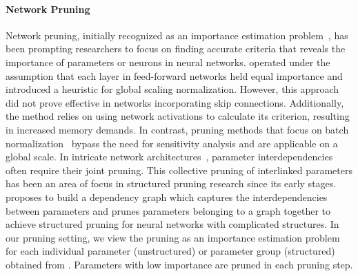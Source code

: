 \paragraph{Network Pruning}
Network pruning, initially recognized as an importance estimation problem~\citep{molchanov2019importance, chauvin1988back, yu2018nisp,he2020learning}, has been prompting researchers to focus on finding accurate criteria that reveals the importance of parameters or neurons in neural networks. \citet{molchanov2016pruning} operated under the assumption that each layer in feed-forward networks held equal importance and introduced a heuristic for global scaling normalization. However, this approach did not prove effective in networks incorporating skip connections. Additionally, the method relies on using network activations to calculate its criterion, resulting in increased memory demands. In contrast, pruning methods that focus on batch normalization~\citep{gordon2018morphnet,huang2018data,liu2017learning,ye2018rethinking} bypass the need for sensitivity analysis and are applicable on a global scale. In intricate network architectures~\citep{liu2021group,luo2020neural,you2019gate,zhang2021aligned}, parameter interdependencies often require their joint pruning. This collective pruning of interlinked parameters has been an area of focus in structured pruning research since its early stages. \citet{fang2023depgraph} proposes to build a dependency graph which captures the interdependencies between parameters and prunes parameters belonging to a graph together to achieve structured pruning for neural networks with complicated structures. In our pruning setting, we view the pruning as an importance estimation problem for each individual parameter (unstructured) or parameter group (structured) obtained from \citet{fang2023depgraph}. Parameters with low importance are pruned in each pruning step.

